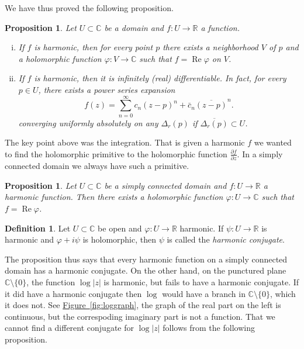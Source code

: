 \documentclass[12pt,openany]{book}
\renewcommand{\Re}{\operatorname{Re}}
\newcommand{\sabs}[1]{\lvert {#1} \rvert}
\newcommand{\C}{{\mathbb{C}}}
\newcommand{\R}{{\mathbb{R}}}
\newcommand{\myindex}[1]{#1\index{#1}}
\theoremstyle{plain}
\newtheorem{prop}[thm]{Proposition}
\theoremstyle{remark}
\theoremstyle{definition}
\newtheorem{defn}[thm]{Definition}
\theoremstyle{exercise}
\theoremstyle{example}
\newcommand{\figureref}[1]{\hyperref[#1]{Figure~\ref*{#1}}}
\begin{document}
We have thus proved the following proposition.

\begin{prop}
Let $U \subset \C$ be a domain and $f \colon U \to \R$ a function.
\begin{enumerate}[(i)]
\item
If $f$ is harmonic,
then for every point $p$ there exists a neighborhood $V$ of $p$ and a
holomorphic function $\varphi \colon V \to \C$ such that $f = \Re \varphi$
on $V$.
\item
If $f$ is harmonic, then it is infinitely (real) differentiable.  In fact,
for every $p \in U$, there exists a power series expansion
\begin{equation*}
f(z) =
\sum_{n=0}^\infty c_n {(z-p)}^n + \bar{c}_n {\overline{(z-p)}}^n .
\end{equation*}
converging uniformly absolutely
on any $\Delta_r(p)$ if $\overline{\Delta_r(p)} \subset U$.
\end{enumerate}
\end{prop}

The key point above was the integration.  That is given a harmonic $f$ we wanted to
find the holomorphic primitive to the holomorphic function
$\frac{\partial f}{\partial z}$.  In a simply connected domain we always
have such a primitive.

\begin{prop}
Let $U \subset \C$ be a simply connected domain and $f \colon U \to \R$ a
harmonic function.  Then there exists a holomorphic function $\varphi \colon
U \to \C$ such that $f = \Re \varphi$.
\end{prop}

\begin{defn}
Let $U \subset \C$ be open and $\varphi \colon U \to \R$ harmonic.
If $\psi \colon U \to \R$ is harmonic and $\varphi + i \psi$ is holomorphic,
then $\psi$ is called the \emph{\myindex{harmonic conjugate}}.
\end{defn}

The proposition thus says that every harmonic function on a simply connected
domain has a harmonic conjugate.  On the other hand, on the punctured plane
$\C \setminus \{ 0 \}$, the function $\log \sabs{z}$ is harmonic, but
fails to have a harmonic conjugate.  If it did have a harmonic conjugate
then $\log$ would have a branch in $\C \setminus \{0\}$, which it does not.
See \figureref{fig:loggraph}, the graph of the real part on the left is
continuous, but the correspoding imaginary part is not a function.
That we cannot find a different conjugate for $\log \sabs{z}$
follows from the following proposition.
\end{document}
